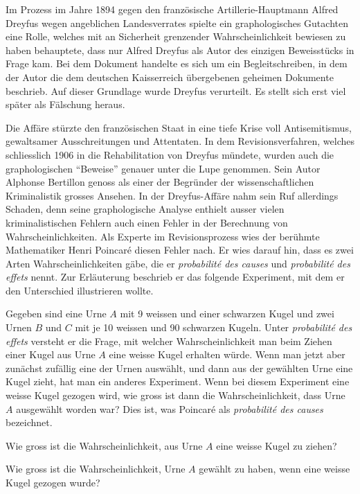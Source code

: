 Im Prozess im Jahre 1894 gegen den französische Artillerie-Hauptmann
Alfred Dreyfus wegen
angeblichen Landesverrates spielte ein graphologisches Gutachten eine
Rolle, welches mit an Sicherheit grenzender Wahrscheinlichkeit bewiesen
zu haben behauptete, dass nur Alfred Dreyfus als Autor des einzigen
Beweisstücks in Frage kam.
Bei dem Dokument handelte es sich um ein Begleitschreiben, in dem der
Autor die dem deutschen Kaisserreich übergebenen geheimen Dokumente
beschrieb.
Auf dieser Grundlage wurde Dreyfus verurteilt.
Es stellt sich erst viel später als Fälschung heraus.

Die Affäre stürzte den französischen Staat in eine tiefe Krise
voll Antisemitismus, gewaltsamer Ausschreitungen und Attentaten.
In dem Revisionsverfahren, welches schliesslich 1906 in die Rehabilitation
von Dreyfus mündete, wurden auch die graphologischen ``Beweise''
genauer unter die Lupe genommen.
Sein Autor Alphonse Bertillon genoss als einer der Begründer
der wissenschaftlichen
Kriminalistik grosses Ansehen. In der Dreyfus-Affäre nahm sein Ruf
allerdings Schaden, denn seine graphologische Analyse enthielt
ausser vielen kriminalistischen Fehlern auch einen Fehler in der
Berechnung von Wahrscheinlichkeiten.
Als Experte im Revisionsprozess wies der berühmte Mathematiker
Henri Poincar\'e diesen Fehler nach.
Er wies darauf hin, dass es zwei Arten Wahrscheinlichkeiten gäbe,
die er {\it probabilit\'e des causes} und {\it probabilit\'e des effets}
nennt.
Zur Erläuterung beschrieb er das folgende Experiment, mit
dem er den Unterschied illustrieren wollte. 

Gegeben sind eine Urne $A$ mit 9 weissen und einer schwarzen Kugel
und zwei Urnen $B$ und $C$ mit je 10 weissen und 90 schwarzen Kugeln.
Unter {\it probabilit\'e des effets} versteht er die Frage, mit welcher
Wahrscheinlichkeit man beim Ziehen einer Kugel aus Urne $A$ eine
weisse Kugel erhalten würde.
Wenn man jetzt aber zunächst zufällig eine der Urnen auswählt, und dann
aus der gewählten Urne eine Kugel zieht, hat man ein anderes
Experiment. 
Wenn bei diesem Experiment eine weisse Kugel gezogen wird, wie gross
ist dann die Wahrscheinlichkeit, dass Urne $A$ ausgewählt worden war?
Dies ist, was Poincar\'e als {\it probabilit\'e des causes} bezeichnet.

\begin{teilaufgaben}
\item Wie gross ist die Wahrscheinlichkeit, aus Urne $A$ eine weisse Kugel
zu ziehen?
\item Wie gross ist die Wahrscheinlichkeit, Urne $A$ gewählt zu haben,
wenn eine weisse Kugel gezogen wurde?
\end{teilaufgaben}

